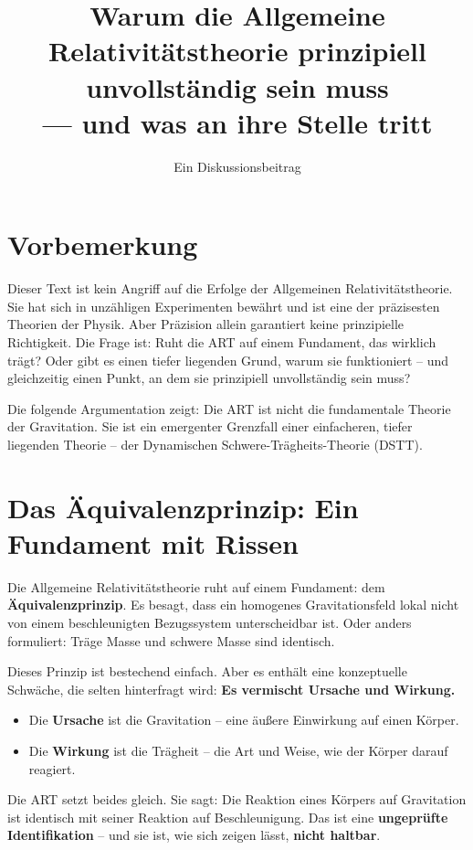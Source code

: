 \documentclass[12pt,a4paper]{article}
\title{\textbf{Warum die Allgemeine Relativitätstheorie prinzipiell unvollständig sein muss} \\
\large — und was an ihre Stelle tritt}
\author{Ein Diskussionsbeitrag}
\date{}
\begin{document}
\maketitle

\section*{Vorbemerkung}

Dieser Text ist kein Angriff auf die Erfolge der Allgemeinen Relativitätstheorie. Sie hat sich in unzähligen Experimenten bewährt und ist eine der präzisesten Theorien der Physik. Aber Präzision allein garantiert keine prinzipielle Richtigkeit. Die Frage ist: Ruht die ART auf einem Fundament, das wirklich trägt? Oder gibt es einen tiefer liegenden Grund, warum sie funktioniert – und gleichzeitig einen Punkt, an dem sie prinzipiell unvollständig sein muss?

Die folgende Argumentation zeigt: Die ART ist nicht die fundamentale Theorie der Gravitation. Sie ist ein emergenter Grenzfall einer einfacheren, tiefer liegenden Theorie – der Dynamischen Schwere-Trägheits-Theorie (DSTT).

\section{Das Äquivalenzprinzip: Ein Fundament mit Rissen}

Die Allgemeine Relativitätstheorie ruht auf einem Fundament: dem \textbf{Äquivalenzprinzip}. Es besagt, dass ein homogenes Gravitationsfeld lokal nicht von einem beschleunigten Bezugssystem unterscheidbar ist. Oder anders formuliert: Träge Masse und schwere Masse sind identisch.

Dieses Prinzip ist bestechend einfach. Aber es enthält eine konzeptuelle Schwäche, die selten hinterfragt wird: \textbf{Es vermischt Ursache und Wirkung.}

\begin{itemize}
    \item Die \textbf{Ursache} ist die Gravitation – eine äußere Einwirkung auf einen Körper.
    \item Die \textbf{Wirkung} ist die Trägheit – die Art und Weise, wie der Körper darauf reagiert.
\end{itemize}

Die ART setzt beides gleich. Sie sagt: Die Reaktion eines Körpers auf Gravitation ist identisch mit seiner Reaktion auf Beschleunigung. Das ist eine \textbf{ungeprüfte Identifikation} – und sie ist, wie sich zeigen lässt, \textbf{nicht haltbar}.
\end{document}
